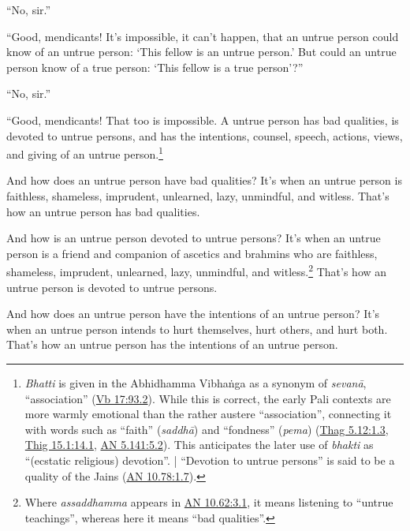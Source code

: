 \documentclass[12pt,openany]{book}%
\begin{document}
“No, sir.” 

“Good, mendicants! It’s impossible, it can’t happen, that an untrue person could know of an untrue person: ‘This fellow is an untrue person.’ But could an untrue person know of a true person: ‘This fellow is a true person’?” 

“No, sir.” 

“Good, mendicants! That too is impossible. A untrue person has bad qualities, is devoted to untrue persons, and has the intentions, counsel, speech, actions, views, and giving of an untrue person.\footnote{\textit{Bhatti} is given in the Abhidhamma \textsanskrit{Vibhaṅga} as a synonym of \textit{\textsanskrit{sevanā}}, “association” (\href{https://suttacentral.net/vb17/en/sujato\#93.2}{Vb 17:93.2}). While this is correct, the early Pali contexts are more warmly emotional than the rather austere “association”, connecting it with words such as “faith” (\textit{\textsanskrit{saddhā}}) and “fondness” (\textit{pema}) (\href{https://suttacentral.net/thag5.12/en/sujato\#1.3}{Thag 5.12:1.3}, \href{https://suttacentral.net/thig15.1/en/sujato\#14.1}{Thig 15.1:14.1}, \href{https://suttacentral.net/an5.141/en/sujato\#5.2}{AN 5.141:5.2}). This anticipates the later use of \textit{bhakti} as “(ecstatic religious) devotion”. | “Devotion to untrue persons” is said to be a quality of the Jains (\href{https://suttacentral.net/an10.78/en/sujato\#1.7}{AN 10.78:1.7}). } 

And how does an untrue person have bad qualities? It’s when an untrue person is faithless, shameless, imprudent, unlearned, lazy, unmindful, and witless. That’s how an untrue person has bad qualities. 

And how is an untrue person devoted to untrue persons? It’s when an untrue person is a friend and companion of ascetics and brahmins who are faithless, shameless, imprudent, unlearned, lazy, unmindful, and witless.\footnote{Where \textit{assaddhamma} appears in \href{https://suttacentral.net/an10.62/en/sujato\#3.1}{AN 10.62:3.1}, it means listening to “untrue teachings”, whereas here it means “bad qualities”. } That’s how an untrue person is devoted to untrue persons. 

And how does an untrue person have the intentions of an untrue person? It’s when an untrue person intends to hurt themselves, hurt others, and hurt both. That’s how an untrue person has the intentions of an untrue person. 
\end{document}
